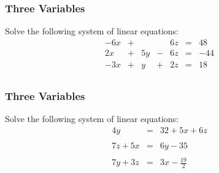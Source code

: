 \documentclass[xcolor=dvipsnames]{beamer}
\begin{document}
\begin{frame}
  \frametitle{Three Variables}
  Solve the following system of linear equations:
  \begin{equation}
    \label{eq:oodaidiz}
    \begin{array}{rcrcrcl}
      -6x&+&&&6z&=&48 \\
      2x&+&5y&-&6z&=&-44 \\
      -3x&+&y&+&2z&=&18 \\
    \end{array}
  \end{equation}
\end{frame}

\begin{frame}
  \frametitle{Three Variables}
  Solve the following system of linear equations:
  \begin{equation}
    \label{eq:ciayamoh}
    \begin{array}{rcl}
      \displaystyle 4y&=&32+5x+6z \\
      && \\
      \displaystyle 7z+5x&=&6y-35 \\
      && \\
      \displaystyle 7y+3z&=&3x-\frac{19}{2} \\
    \end{array}
  \end{equation}
\end{frame}
\end{document}

